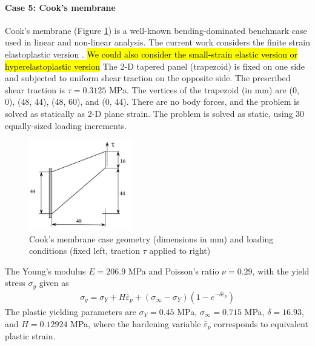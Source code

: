 \documentclass[sn-mathphys,Numbered]{sn-jnl}%
\begin{document}
\paragraph{Case 5: Cook's membrane}
Cook's membrane (Figure \ref{fig:cooks_membrane}) is a well-known bending-dominated benchmark case used in linear and non-linear analysis.
The current work considers the finite strain elastoplastic version \citep{Simo1992}. \hl{We could also consider the small-strain elastic version or hyperelastoplastic version}
The 2-D tapered panel (trapezoid) is fixed on one side and subjected to uniform shear traction on the opposite side.
The prescribed shear traction is $\tau = 0.3125$ MPa.
The vertices of the trapezoid (in mm) are (0, 0), (48, 44), (48, 60),  and (0, 44).
There are no body forces, and the problem is solved as statically as 2-D plane strain.
The problem is solved as static, using 30 equally-sized loading increments.
\begin{figure}[htbp]
   \centering
   \includegraphics[width=0.4\textwidth]{figures/cooksMembrane-geometry.png} 
   \caption{Cook's membrane case geometry (dimensions in mm) and loading conditions (fixed left, traction $\tau$ applied to right)}
   \label{fig:cooks_membrane}
\end{figure}

The Young's modulus $E = 206.9$ MPa and Poisson's ratio $\nu=0.29$, with the yield stress $\sigma_y$ given as \citep{Simo1992}
\begin{eqnarray}
	\sigma_y = \sigma_Y + H\bar{\varepsilon}_p + (\sigma_{\infty} - \sigma_Y)(1- e^{-\delta\bar{\varepsilon}_p})
\end{eqnarray}
The plastic yielding parameters are $\sigma_Y = 0.45$ MPa, $\sigma_{\infty} = 0.715$ MPa, $\delta = 16.93$, and $H = 0.12924$ MPa, where the hardening variable $\bar{\varepsilon}_p$ corresponds to equivalent plastic strain.
\end{document}
